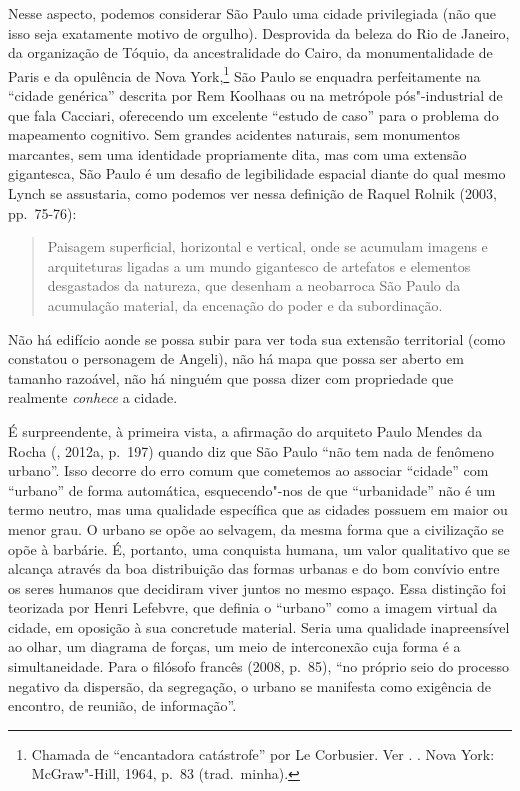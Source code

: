Nesse aspecto, podemos considerar São Paulo uma cidade privilegiada (não
que isso seja exatamente motivo de orgulho). Desprovida da beleza do Rio
de Janeiro, da organização de Tóquio, da ancestralidade do Cairo, da
monumentalidade de Paris e da opulência de Nova York,\footnote{Chamada de
  ``encantadora catástrofe'' por Le Corbusier. Ver . {}. Nova York:
  McGraw"-Hill, 1964, p.~83 (trad.~minha).} São Paulo se enquadra
perfeitamente na ``cidade genérica'' descrita por Rem Koolhaas ou na
metrópole pós"-industrial de que fala Cacciari, oferecendo um excelente
``estudo de caso'' para o problema do mapeamento cognitivo. Sem grandes
acidentes naturais, sem monumentos marcantes, sem uma identidade
propriamente dita, mas com uma extensão gigantesca, São Paulo é um
desafio de legibilidade espacial diante do qual mesmo Lynch se
assustaria, como podemos ver nessa definição de Raquel Rolnik (2003, pp.~75-76):

\begin{quote}
Paisagem superficial, horizontal e vertical, onde se acumulam imagens e
arquiteturas ligadas a um mundo gigantesco de artefatos e elementos
desgastados da natureza, que desenham a neobarroca São Paulo da
acumulação material, da encenação do poder e da subordinação.
\end{quote}

Não há edifício aonde se possa subir para ver toda sua extensão
territorial (como constatou o personagem de Angeli), não há mapa que
possa ser aberto em tamanho razoável, não há ninguém que possa dizer com
propriedade que realmente \emph{conhece} a cidade.

É surpreendente, à primeira vista, a afirmação do arquiteto Paulo Mendes
da Rocha (, 2012a, p.~197) quando diz que São Paulo ``não tem nada
de fenômeno urbano''. Isso decorre do erro comum que cometemos ao
associar ``cidade'' com ``urbano'' de forma automática, esquecendo"-nos
de que ``urbanidade'' não é um termo neutro, mas uma qualidade
específica que as cidades possuem em maior ou menor grau. O urbano se
opõe ao selvagem, da mesma forma que a civilização se opõe à barbárie.
É, portanto, uma conquista humana, um valor qualitativo que se alcança
através da boa distribuição das formas urbanas e do bom convívio entre
os seres humanos que decidiram viver juntos no mesmo espaço. Essa
distinção foi teorizada por Henri Lefebvre, que definia o ``urbano''
como a imagem virtual da cidade, em oposição à sua concretude material.
Seria uma qualidade inapreensível ao olhar, um diagrama de forças, um
meio de interconexão cuja forma é a simultaneidade. Para o filósofo
francês (2008, p.~85), ``no próprio seio do processo negativo da
dispersão, da segregação, o urbano se manifesta como exigência de
encontro, de reunião, de informação''.

